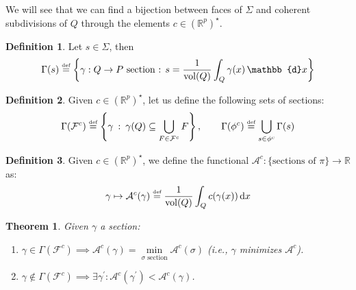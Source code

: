 \documentclass[10pt,a4paper]{article}
\DeclareMathOperator{\vol}{vol}
\def\defs{\stackrel{\tiny{\mbox{def}}}{=}}		%
\newcommand{\RR}{\mathbb{R}}
\theoremstyle{plain}
\newtheorem{theorem}{Theorem}
\theoremstyle{remark}
\theoremstyle{definition}
\newtheorem{definition}{Definition}
\begin{document}
    We will see that we can find a bijection between faces of $\Sigma$ and coherent subdivisions of $Q$
    through the elements $c\in(\RR^p)^\star$.
    
    \begin{definition}
        Let $s\in\Sigma$, then
        \begin{equation}
        \Gamma(s)\defs \left\{\gamma:Q\to P \mbox{ section : } 
        s = \frac{1}{\vol(Q)}\int_Q\gamma(x) \,\mathbb{d}x \right\}
        \end{equation}
    \end{definition}
    \begin{definition}
        Given $c\in(\RR^p)^\star$, let us define the following sets of sections:
        \begin{equation}
        \Gamma(\mathcal{F}^c) \defs 
        \left\{ \gamma\::\: \gamma(Q)\subseteq \bigcup_{F\in \mathcal{F}^c} F \right\}, \qquad
        \Gamma(\phi^c) \defs 
        \bigcup_{s\in\phi^c} \Gamma(s) 
        \end{equation}
    \end{definition}
    \begin{definition}
        Given $c\in(\RR^p)^\star$, we define the functional 
        $\mathcal{A}^c:\{\mbox{sections of } \pi \} \to \RR$ as:
        \begin{equation}
        \gamma \mapsto \mathcal{A}^c(\gamma) 
        \defs \frac1{\vol(Q)} \int_Q c(\gamma(x))\,\mbox{d}x
        \end{equation}
    \end{definition}
    \begin{theorem}
        Given $\gamma$ a section: 
        \begin{enumerate}
            \item $\gamma\in\Gamma(\mathcal{F}^c) 
            \implies  \mathcal{A}^c(\gamma) = 
            \min\limits_{\sigma \text{ section}}\mathcal{A}^c(\sigma)$
            (i.e., $\gamma$ minimizes $\mathcal{A}^c$).
            \item $\gamma\notin\Gamma(\mathcal{F}^c)
            \implies \exists \gamma^\prime : 
            \mathcal{A}^c(\gamma^\prime) < \mathcal{A}^c( \gamma)$.
        \end{enumerate}
    \end{theorem}
\end{document}
